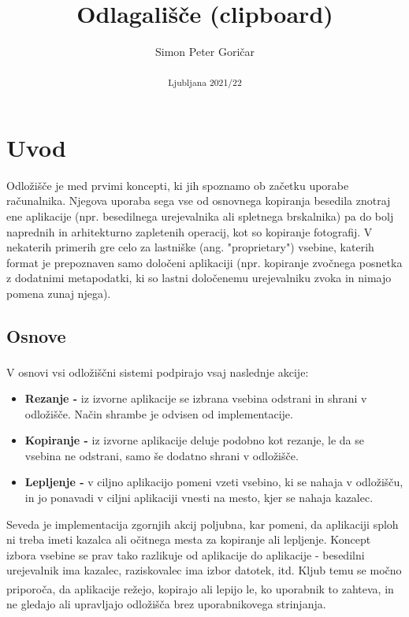 \documentclass[12pt, A4]{article}
\title{\textbf{Odlagališče (clipboard)}}
\author{Simon Peter Goričar}
\date{\textsubscript{Ljubljana 2021/22}}
\begin{document}
	\begin{titlepage}
		\maketitle
	\end{titlepage}
	\pagebreak
	
	\tableofcontents
	\pagebreak
	
	
	\section{Uvod}	
	Odložišče je med prvimi koncepti, ki jih spoznamo ob začetku uporabe računalnika. Njegova uporaba sega vse od osnovnega kopiranja besedila znotraj ene aplikacije (npr. besedilnega urejevalnika ali spletnega brskalnika) pa do bolj naprednih in arhitekturno zapletenih operacij, kot so kopiranje fotografij. V nekaterih primerih gre celo za lastniške (ang. "proprietary") vsebine, katerih format je prepoznaven samo določeni aplikaciji (npr. kopiranje zvočnega posnetka z dodatnimi metapodatki, ki so lastni določenemu urejevalniku zvoka in nimajo pomena zunaj njega).
	
	\subsection{Osnove}
	V osnovi vsi odložiščni sistemi podpirajo vsaj naslednje akcije\textsuperscript{\cite{winclipboardabout}}:
	\begin{itemize}
		\item \textbf{Rezanje -} iz izvorne aplikacije se izbrana vsebina odstrani in shrani v odložišče. Način shrambe je odvisen od implementacije.
		\item \textbf{Kopiranje -} iz izvorne aplikacije deluje podobno kot rezanje, le da se vsebina ne odstrani, samo še dodatno shrani v odložišče.
		\item \textbf{Lepljenje -} v ciljno aplikacijo pomeni vzeti vsebino, ki se nahaja v odložišču, in jo ponavadi v ciljni aplikaciji vnesti na mesto, kjer se nahaja kazalec.
	\end{itemize}
	
	Seveda je implementacija zgornjih akcij poljubna, kar pomeni, da aplikaciji sploh ni treba imeti kazalca ali očitnega mesta za kopiranje ali lepljenje. Koncept izbora vsebine se prav tako razlikuje od aplikacije do aplikacije - besedilni urejevalnik ima kazalec, raziskovalec ima izbor datotek, itd. Kljub temu se močno priporoča\textsuperscript{\cite{winclipboardabout}}, da aplikacije režejo, kopirajo ali lepijo le, ko uporabnik to zahteva, in ne gledajo ali upravljajo odložišča brez uporabnikovega strinjanja.
	
\end{document}
